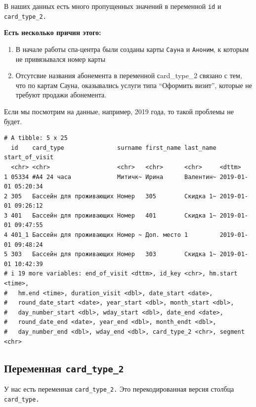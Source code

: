 \documentclass[
  letterpaper,
  DIV=11,
  numbers=noendperiod]{scrartcl}
\begin{document}
В наших данных есть много пропущенных значений в переменной \texttt{id}
и \texttt{сard\_type\_2.}

\textbf{Есть несколько причин этого:}

\begin{enumerate}
\def\labelenumi{\arabic{enumi}.}
\item
  В начале работы спа-центра были созданы карты \texttt{Сауна} и
  \texttt{Аноним}, к которым не привязывался номер карты
\item
  Отсутсвие названия абонемента в переменной сard\_type\_2 связано с
  тем, что по картам Сауна, оказывались услуги типа ``Оформить визит'',
  которые не требуют продажи абонемента.
\end{enumerate}

Если мы посмотрим на данные, например, 2019 года, то такой проблемы не
будет.

\begin{verbatim}
# A tibble: 5 x 25
  id    сard_type               surname first_name last_name start_of_visit     
  <chr> <chr>                   <chr>   <chr>      <chr>     <dttm>             
1 05334 #А4 24 часа             Митичк~ Ирина      Валентин~ 2019-01-01 05:20:34
2 305   Бассейн для проживающих Номер   305        Скидка 1~ 2019-01-01 09:26:12
3 401   Бассейн для проживающих Номер   401        Скидка 1~ 2019-01-01 09:47:55
4 401_1 Бассейн для проживающих Номер ~ Доп. место 1         2019-01-01 09:48:24
5 303   Бассейн для проживающих Номер   303        Скидка 1~ 2019-01-01 10:42:39
# i 19 more variables: end_of_visit <dttm>, id_key <chr>, hm.start <time>,
#   hm.end <time>, duration_visit <dbl>, date_start <date>,
#   round_date_start <date>, year_start <dbl>, month_start <dbl>,
#   day_number_start <dbl>, wday_start <dbl>, date_end <date>,
#   round_date_end <date>, year_end <dbl>, month_endt <dbl>,
#   day_number_end <dbl>, wday_end <dbl>, сard_type_2 <chr>, segment <chr>
\end{verbatim}

\hypertarget{ux43fux435ux440ux435ux43cux435ux43dux43dux430ux44f-ux441ard_type_2}{%
\subsection*{\texorpdfstring{Переменная
\texttt{сard\_type\_2}}{Переменная сard\_type\_2}}\label{ux43fux435ux440ux435ux43cux435ux43dux43dux430ux44f-ux441ard_type_2}}

У нас есть переменная \texttt{сard\_type\_2.} Это перекодированная
версия столбца \texttt{сard\_type.}
\end{document}
